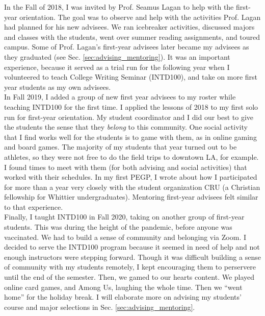 \documentclass[../../../main.tex]{subfiles}
\begin{document}
\label{sec:first_year}

In the Fall of 2018, I was invited by Prof. Seamus Lagan to help with the first-year orientation.  The goal was to observe and help with the activities Prof. Lagan had planned for his new advisees.  We ran icebreaker activities, discussed majors and classes with the students, went over summer reading assignments, and toured campus.  Some of Prof. Lagan's first-year advisees later became my advisees as they graduated (see Sec. \ref{sec:advising_mentoring}).  It was an important experience, because it served as a trial run for the following year when I volunteered to teach College Writing Seminar (INTD100), and take on more first year students as my own advisees.
\\
\vspace{0.25cm}
In Fall 2019, I added a group of new first year advisees to my roster while teaching INTD100 for the first time.  I applied the lessons of 2018 to my first solo run for first-year orientation.  My student coordinator and I did our best to give the students the sense that they \textit{belong} to this community.  One social activity that I find works well for the students is to game with them, as in online gaming and board games.  The majority of my students that year turned out to be athletes, so they were not free to do the field trips to downtown LA, for example.  I found times to meet with them (for both advising and social activities) that worked with their schedules.  In my first PEGP, I wrote about how I participated for more than a year very closely with the student organization CRU (a Christian fellowship for Whittier undergraduates).  Mentoring first-year advisees felt similar to that experience.
\\
\vspace{0.25cm}
Finally, I taught INTD100 in Fall 2020, taking on another group of first-year students.  This was during the height of the pandemic, before anyone was vaccinated.  We had to build a sense of community and belonging via Zoom.  I decided to serve the INTD100 program because it seemed in need of help and not enough instructors were stepping forward.  Though it was difficult building a sense of community with my students remotely, I kept encouraging them to perservere until the end of the semester.  Then, we gamed to our hearts content.  We played online card games, and Among Us, laughing the whole time.  Then we ``went home'' for the holiday break.  I will elaborate more on advising my students' course and major selections in Sec. \ref{sec:advising_mentoring}.
\end{document}
